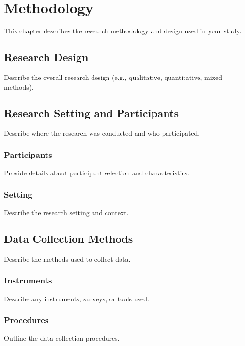 \chapter{Methodology}

This chapter describes the research methodology and design used in your study.

\section{Research Design}

Describe the overall research design (e.g., qualitative, quantitative, mixed methods).

\section{Research Setting and Participants}

Describe where the research was conducted and who participated.

\subsection{Participants}

Provide details about participant selection and characteristics.

\subsection{Setting}

Describe the research setting and context.

\section{Data Collection Methods}

Describe the methods used to collect data.

\subsection{Instruments}

Describe any instruments, surveys, or tools used.

\subsection{Procedures}

Outline the data collection procedures.

